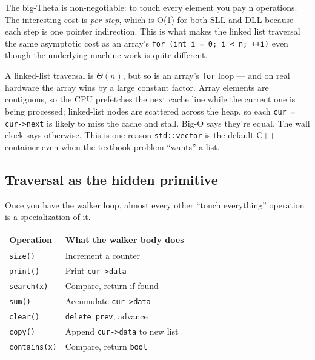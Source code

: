\documentclass[11pt]{article}
\begin{document}
The big-Theta is non-negotiable: to touch every element you pay
n operations. The interesting cost is \emph{per-step}, which is
O(1) for both SLL and DLL because each step is one pointer
indirection. This is what makes the linked list traversal the
same asymptotic cost as an array's \texttt{for (int i = 0; i < n;
++i)} even though the underlying machine work is quite different.

\begin{notebox}
A linked-list traversal is $\Theta(n)$, but so is an array's
\texttt{for} loop --- and on real hardware the array wins by a
large constant factor. Array elements are contiguous, so the CPU
prefetches the next cache line while the current one is being
processed; linked-list nodes are scattered across the heap, so
each \texttt{cur = cur->next} is likely to miss the cache and
stall. Big-O says they're equal. The wall clock says otherwise.
This is one reason \texttt{std::vector} is the default C++
container even when the textbook problem ``wants'' a list.
\end{notebox}

\subsection*{Traversal as the hidden primitive}

Once you have the walker loop, almost every other ``touch
everything'' operation is a specialization of it.

\begin{center}
\begin{tabular}{|l|l|}
\hline
\textbf{Operation} & \textbf{What the walker body does} \\
\hline
\texttt{size()}         & Increment a counter \\
\texttt{print()}        & Print \texttt{cur->data} \\
\texttt{search(x)}      & Compare, return if found \\
\texttt{sum()}          & Accumulate \texttt{cur->data} \\
\texttt{clear()}        & \texttt{delete prev}, advance \\
\texttt{copy()}         & Append \texttt{cur->data} to new list \\
\texttt{contains(x)}    & Compare, return \texttt{bool} \\
\hline
\end{tabular}
\end{center}
\end{document}
